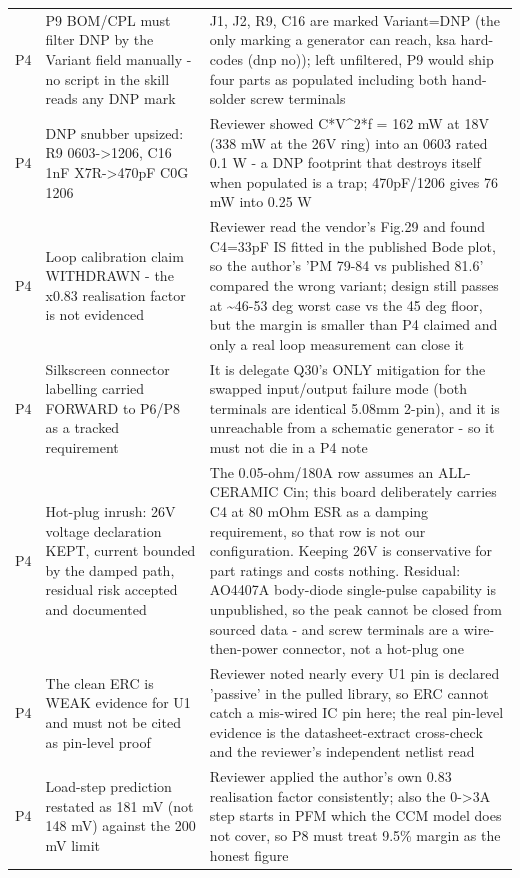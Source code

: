 \documentclass[11pt,a4paper]{article}
\begin{document}
{\begin{longtable}{lp{5.2cm}p{7.2cm}}
P4 & P9 BOM/CPL must filter DNP by the Variant field manually - no script in the skill reads any DNP mark & J1, J2, R9, C16 are marked Variant=DNP (the only marking a generator can reach, ksa hard-codes (dnp no)); left unfiltered, P9 would ship four parts as populated including both hand-solder screw terminals \\
P4 & DNP snubber upsized: R9 0603-\textgreater{}1206, C16 1nF X7R-\textgreater{}470pF C0G 1206 & Reviewer showed C{*}V\textasciicircum{}2{*}f = 162 mW at 18V (338 mW at the 26V ring) into an 0603 rated 0.1 W - a DNP footprint that destroys itself when populated is a trap; 470pF/1206 gives 76 mW into 0.25 W \\
P4 & Loop calibration claim WITHDRAWN - the x0.83 realisation factor is not evidenced & Reviewer read the vendor's Fig.29 and found C4=33pF IS fitted in the published Bode plot, so the author's 'PM 79-84 vs published 81.6' compared the wrong variant; design still passes at \textasciitilde{}46-53 deg worst case vs the 45 deg floor, but the margin is smaller than P4 claimed and only a real loop measurement can close it \\
P4 & Silkscreen connector labelling carried FORWARD to P6/P8 as a tracked requirement & It is delegate Q30's ONLY mitigation for the swapped input/output failure mode (both terminals are identical 5.08mm 2-pin), and it is unreachable from a schematic generator - so it must not die in a P4 note \\
P4 & Hot-plug inrush: 26V voltage declaration KEPT, current bounded by the damped path, residual risk accepted and documented & The 0.05-ohm/180A row assumes an ALL-CERAMIC Cin; this board deliberately carries C4 at 80 mOhm ESR as a damping requirement, so that row is not our configuration. Keeping 26V is conservative for part ratings and costs nothing. Residual: AO4407A body-diode single-pulse capability is unpublished, so the peak cannot be closed from sourced data - and screw terminals are a wire-then-power connector, not a hot-plug one \\
P4 & The clean ERC is WEAK evidence for U1 and must not be cited as pin-level proof & Reviewer noted nearly every U1 pin is declared 'passive' in the pulled library, so ERC cannot catch a mis-wired IC pin here; the real pin-level evidence is the datasheet-extract cross-check and the reviewer's independent netlist read \\
P4 & Load-step prediction restated as 181 mV (not 148 mV) against the 200 mV limit & Reviewer applied the author's own 0.83 realisation factor consistently; also the 0-\textgreater{}3A step starts in PFM which the CCM model does not cover, so P8 must treat 9.5\% margin as the honest figure \\

\end{longtable}}
\end{document}
